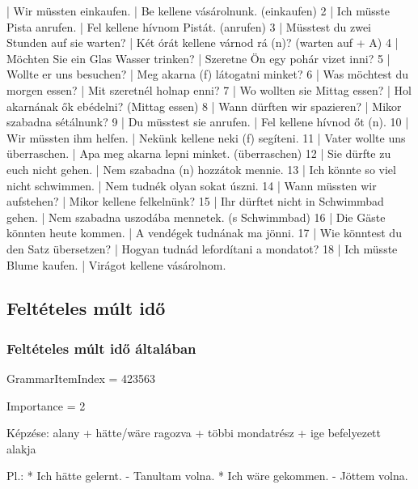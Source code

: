 \documentclass{article}
\newenvironment{desc}{\verbatim}{\endverbatim}
\newenvironment{exmp}{\verbatim}{\endverbatim}
\begin{document}
\begin{exmp}
1 | Wir müssten einkaufen. | Be kellene vásárolnunk. (einkaufen)
2 | Ich müsste Pista anrufen. | Fel kellene hívnom Pistát. (anrufen)
3 | Müsstest du zwei Stunden auf sie warten? | Két órát kellene várnod rá (n)? (warten auf + A)
4 | Möchten Sie ein Glas Wasser trinken? | Szeretne Ön egy pohár vizet inni?
5 | Wollte er uns besuchen? | Meg akarna (f) látogatni minket?
6 | Was möchtest du morgen essen? | Mit szeretnél holnap enni?
7 | Wo wollten sie Mittag essen? | Hol akarnának ők ebédelni? (Mittag essen)
8 | Wann dürften wir spazieren? | Mikor szabadna sétálnunk?
9 | Du müsstest sie anrufen. | Fel kellene hívnod őt (n).
10 | Wir müssten ihm helfen. | Nekünk kellene neki (f) segíteni.
11 | Vater wollte uns überraschen. | Apa meg akarna lepni minket. (überraschen)
12 | Sie dürfte zu euch nicht gehen. | Nem szabadna (n) hozzátok mennie.
13 | Ich könnte so viel nicht schwimmen. | Nem tudnék olyan sokat úszni.
14 | Wann müssten wir aufstehen? | Mikor kellene felkelnünk?
15 | Ihr dürftet nicht in Schwimmbad gehen. | Nem szabadna uszodába mennetek. (s Schwimmbad)
16 | Die Gäste könnten heute kommen. | A vendégek tudnának ma jönni.
17 | Wie könntest du den Satz übersetzen? | Hogyan tudnád lefordítani a mondatot?
18 | Ich müsste Blume kaufen. | Virágot kellene vásárolnom.
\end{exmp}

\subsection{Feltételes múlt idő}

\subsubsection{Feltételes múlt idő általában}

GrammarItemIndex = 423563

Importance = 2

\begin{desc}
Képzése:
alany + hätte/wäre ragozva + többi mondatrész + ige befelyezett alakja

Pl.: * Ich hätte gelernt. - Tanultam volna.
* Ich wäre gekommen. - Jöttem volna.
\end{desc}
\end{document}
